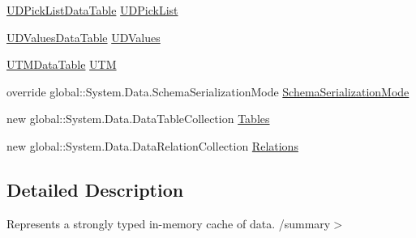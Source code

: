 \begin{DoxyCompactItemize}
\item 
\hyperlink{class_env_int_1_1_win32_1_1_field_tech_1_1_manager_1_1_data_sets_1_1_guide_ware_mobile_data_set_1_1_u_d_pick_list_data_table}{U\+D\+Pick\+List\+Data\+Table} \hyperlink{class_env_int_1_1_win32_1_1_field_tech_1_1_manager_1_1_data_sets_1_1_guide_ware_mobile_data_set_a7fa9333730ca36b6ce547e250d5fa3f4}{U\+D\+Pick\+List}
\item 
\hyperlink{class_env_int_1_1_win32_1_1_field_tech_1_1_manager_1_1_data_sets_1_1_guide_ware_mobile_data_set_1_1_u_d_values_data_table}{U\+D\+Values\+Data\+Table} \hyperlink{class_env_int_1_1_win32_1_1_field_tech_1_1_manager_1_1_data_sets_1_1_guide_ware_mobile_data_set_a1fc102b4d5f93e8270dc5d2215b8ff7d}{U\+D\+Values}
\item 
\hyperlink{class_env_int_1_1_win32_1_1_field_tech_1_1_manager_1_1_data_sets_1_1_guide_ware_mobile_data_set_1_1_u_t_m_data_table}{U\+T\+M\+Data\+Table} \hyperlink{class_env_int_1_1_win32_1_1_field_tech_1_1_manager_1_1_data_sets_1_1_guide_ware_mobile_data_set_a6e63afc5641fa72c1be193e87a2583e7}{U\+T\+M}
\item 
override global\+::\+System.\+Data.\+Schema\+Serialization\+Mode \hyperlink{class_env_int_1_1_win32_1_1_field_tech_1_1_manager_1_1_data_sets_1_1_guide_ware_mobile_data_set_a8bfa1c2ebef0663fbbf5f1dbb89ae3ae}{Schema\+Serialization\+Mode}
\item 
new global\+::\+System.\+Data.\+Data\+Table\+Collection \hyperlink{class_env_int_1_1_win32_1_1_field_tech_1_1_manager_1_1_data_sets_1_1_guide_ware_mobile_data_set_ab93d28e5a7abbc680d111ad0fbfffc2f}{Tables}
\item 
new global\+::\+System.\+Data.\+Data\+Relation\+Collection \hyperlink{class_env_int_1_1_win32_1_1_field_tech_1_1_manager_1_1_data_sets_1_1_guide_ware_mobile_data_set_a079a3cdc8b6d1f006bd8c556d2943aa1}{Relations}
\end{DoxyCompactItemize}


\subsection{Detailed Description}
Represents a strongly typed in-\/memory cache of data. /summary$>$ 

